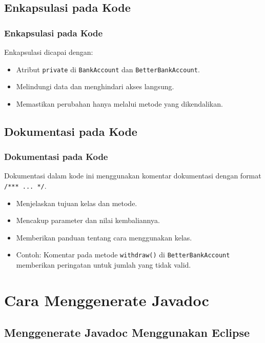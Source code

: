 \documentclass[aspectratio=169, table]{beamer}
\begin{document}
\subsection{Enkapsulasi pada Kode}

\begin{frame}
\frametitle{Enkapsulasi pada Kode}
Enkapsulasi dicapai dengan:
\begin{itemize}
	\item Atribut \texttt{private} di \texttt{BankAccount} dan \texttt{BetterBankAccount}.
	\item Melindungi data dan menghindari akses langsung.
	\item Memastikan perubahan hanya melalui metode yang dikendalikan.
\end{itemize}
\end{frame}


\subsection{Dokumentasi pada Kode}

\begin{frame}
\frametitle{Dokumentasi pada Kode}
Dokumentasi dalam kode ini menggunakan komentar dokumentasi dengan format \texttt{/*** ... */}.
\begin{itemize}
	\item Menjelaskan tujuan kelas dan metode.
	\item Mencakup parameter dan nilai kembaliannya.
	\item Memberikan panduan tentang cara menggunakan kelas.
	\item Contoh: Komentar pada metode \texttt{withdraw()} di \texttt{BetterBankAccount} memberikan peringatan untuk jumlah yang tidak valid.
\end{itemize}
\end{frame}

\section{Cara Menggenerate Javadoc}

\subsection{Menggenerate Javadoc Menggunakan Eclipse}
\end{document}
